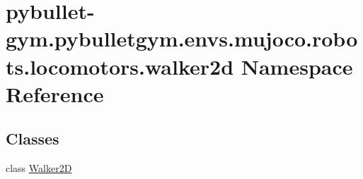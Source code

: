 \hypertarget{namespacepybullet-gym_1_1pybulletgym_1_1envs_1_1mujoco_1_1robots_1_1locomotors_1_1walker2d}{}\section{pybullet-\/gym.pybulletgym.\+envs.\+mujoco.\+robots.\+locomotors.\+walker2d Namespace Reference}
\label{namespacepybullet-gym_1_1pybulletgym_1_1envs_1_1mujoco_1_1robots_1_1locomotors_1_1walker2d}
\subsection*{Classes}
\begin{DoxyCompactItemize}
\item 
class \hyperlink{classpybullet-gym_1_1pybulletgym_1_1envs_1_1mujoco_1_1robots_1_1locomotors_1_1walker2d_1_1_walker2_d}{Walker2D}
\end{DoxyCompactItemize}

